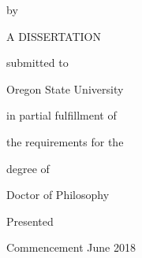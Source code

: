 \documentclass[titlepage,12pt]{article}
\begin{document}
\singlespacing
\centering

\ThesisTitle

\vspace{24pt}
\noindent
by

\noindent
\ThesisAuthor

\vspace{3cm}
\noindent
A DISSERTATION

\vspace{24pt}
\noindent

submitted to

\vspace{24pt}
\noindent

Oregon State University

\vspace{3cm}

\noindent
in partial fulfillment of

\noindent
the requirements for the

\noindent
degree of

\vspace{24pt}

\noindent
Doctor of Philosophy

\vspace{3cm}

\noindent
Presented \DefenseDate\par
\noindent
Commencement June 2018

\thispagestyle{empty}
\end{document}
